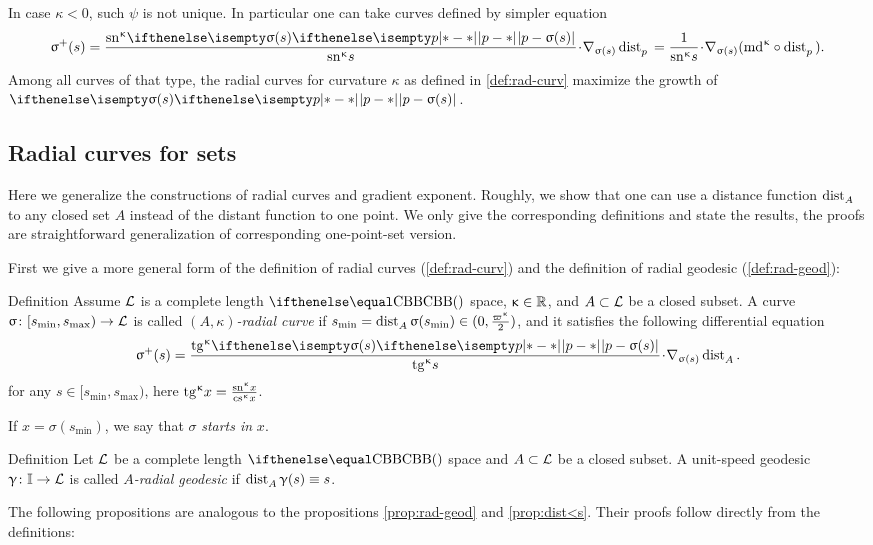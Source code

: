 In case $\kappa<0$, such $\psi$ is not unique.
In particular one can take curves defined by simpler equation
\[\sigma^+(s)
=
\frac{\sn\kappa \dist[{{}}]{p}{\sigma(s)}{}}{\sn\kappa s}\cdot\nabla_{\sigma(s)}\distfun{p}{}{}
=
\frac{1}{\sn\kappa s}\cdot\nabla_{\sigma(s)}(\md\kappa\circ\distfun{p}{}{}).\]
Among all curves of that type, the radial curves for curvature $\kappa$ 
as defined in \ref{def:rad-curv} maximize the growth of $\dist{p}{\sigma(s)}{}$.

\subsection*{Radial curves for sets}

Here we generalize the constructions of radial curves and gradient exponent.
Roughly, we show that one can use a distance function 
$\mathop{\rm dist}\nolimits_{A}^{{}}{}{}$ to any closed set $A$ instead of the distant function to one point.
We only give the corresponding definitions and state the results,
the proofs are straightforward generalization of corresponding one-point-set version. 

First we give a more general form of the definition of radial curves (\ref{def:rad-curv}) and the definition of radial geodesic (\ref{def:rad-geod}):

\begin{thm}{Definition}
Assume $\mathcal{L}$ is a complete length $\Alex{}$ space, 
$\kappa\in\RR$, 
and $A\subset \spc{L}$ be a closed subset.
A curve $\sigma\:[s_{\min},s_{\max})\to \spc{L}$  is called 
\emph{$(A,\kappa)$-radial curve} 
if
$s_{\min}
\z=
\distfun{A}{\sigma(s_{\min})}{}\in(0,\tfrac{\varpi\kappa}2)$, 
and it satisfies the following differential equation
\[\sigma^+(s)
\z=
\frac{\tg\kappa\dist[{{}}]{p}{\sigma(s)}{}}{\tg\kappa s}
\cdot
\nabla_{\sigma(s)}\distfun{A}{}{}.\]
for any $s\in[s_{\min},s_{\max})$, here $\mathrm{tg}^{\upkappa} x=\frac{\mathrm{sn}^{\upkappa} x}{\mathrm{cs}^{\upkappa} x}$.

If $x=\sigma(s_{\min})$, we say that $\sigma$ {}\emph{starts in}  $x$.
\end{thm}

\begin{thm}{Definition}
Let $\mathcal{L}$ be a complete length $\Alex{}$ space
and $A\subset \spc{L}$ be a closed subset.
A unit-speed geodesic  $\gamma\:\II\to \spc{L}$  is called 
\emph{$A$-radial geodesic} if 
$\mathop{\rm dist}\nolimits_{A}^{{}}{\upgamma(s)}{}\equiv s$.
\end{thm}

The following propositions are analogous to the propositions \ref{prop:rad-geod} and \ref{prop:dist<s}.
Their proofs follow directly from the definitions: 

